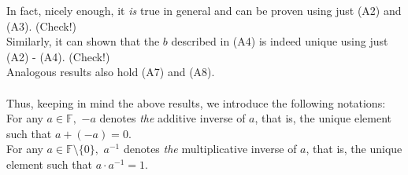\documentclass{article}
\begin{document}
In fact, nicely enough, it \emph{is} true in general and can be proven using just (A2) and (A3). (Check!)\\
Similarly, it can shown that the $b$ described in (A4) is indeed unique using just (A2) - (A4). (Check!)\\
Analogous results also hold (A7) and (A8).\\~\\
Thus, keeping in mind the above results, we introduce the following notations:\\
For any $a \in \mathbb{F},$ $-a$ denotes \emph{the} additive inverse of $a$, that is, the unique element such that $a + (-a) = 0.$\\
For any $a \in \mathbb{F}\setminus\{0\},$ $a^{-1}$ denotes \emph{the} multiplicative inverse of $a$, that is, the unique element such that $a \cdot a^{-1} = 1.$
\end{document}
